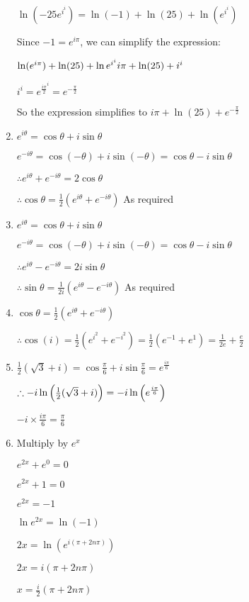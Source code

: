 \documentclass[../main.tex]{subfiles}
\begin{document}
\begin{spacing}{1.5}
\begin{enumerate}
    \(\ln{(-25e^{i^{i}})}=\ln(-1)+\ln(25)+\ln(e^{i^{i}})\)

    Since \(-1=e^{i \pi}\), we can simplify the expression:

    \(\ln(e^{i \pi})+\ln(25)+\ln{e^{i^{i}}}\\
    i \pi + \ln(25) + i^i\)

    \(i^i=e^{\frac{i \pi}{2}^{i}}=e^{-\frac{\pi}{2}}\)

    So the expression simplifies to \(i \pi + \ln(25) + e^{-\frac{\pi}{2}}\)
    
    \item 
    \(e^{i\theta}=\cos{\theta}+i\sin{\theta}\)

    \(e^{-i\theta}=\cos{(-\theta)}+i\sin{(-\theta)}=\cos{\theta}-i\sin{\theta}\)

    \(\therefore e^{i\theta}+e^{-i\theta}=2\cos{\theta}\)

    \(\therefore \cos{\theta}=\frac{1}{2}(e^{i\theta}+e^{-i\theta})\)
    As required

    \item 
    \(e^{i\theta}=\cos{\theta}+i\sin{\theta}\)

    \(e^{-i\theta}=\cos{(-\theta)}+i\sin{(-\theta)}=\cos{\theta}-i\sin{\theta}\)

    \(\therefore e^{i\theta}-e^{-i\theta}=2i\sin{\theta}\)

    \(\therefore \sin{\theta}=\frac{1}{2i}(e^{i\theta}-e^{-i\theta})\)
    As required

    \item 
    \(\cos{\theta}=\frac{1}{2}(e^{i\theta}+e^{-i\theta})\)

    \(\therefore \cos{(i)}=\frac{1}{2}(e^{i^2}+e^{-i^2})=\frac{1}{2}(e^{-1}+e^{1})=\frac{1}{2e}+\frac{e}{2}\)

    \item 
    \(\frac{1}{2}(\sqrt{3}+i)=\cos{\frac{\pi}{6}}+i\sin{\frac{\pi}{6}}=e^{\frac{i\pi}{6}}\)

    \(\therefore -i\ln{\Bigl(\frac{1}{2}(\sqrt{3}+i)\Bigr)} = -i\ln{\Bigl(e^{\frac{i\pi}{6}}\Bigr)}\)

    \(-i \times \frac{i\pi}{6}=\frac{\pi}{6}\)

    \item 
    
    Multiply by $e^x$
    
    $e^{2x}+e^{0}=0$

    $e^{2x}+1=0$

    $e^{2x}=-1$

    $\ln{e^{2x}}=\ln{(-1)}$

    $2x=\ln{(e^{i(\pi +2n\pi)})}$

    $2x=i(\pi + 2n\pi)$

    $x=\frac{i}{2}(\pi + 2n\pi)$

\end{enumerate}
\end{spacing}
\end{document}
